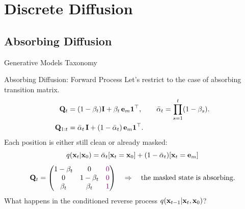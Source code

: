 \documentclass{beamer}
\begin{document}
\section{Discrete Diffusion}
\subsection{Absorbing Diffusion}
\begin{frame}{Generative Models Taxonomy}
\end{frame}
\begin{frame}{Absorbing Diffusion: Forward Process}
	Let's restrict to the case of absorbing transition matrix.
	\vspace{-0.3cm}
	\begin{align*}
		\mathbf{Q}_t &= (1-\beta_t)\mathbf{I} + \beta_t\, \mathbf{e}_m \mathbf{1}^\top,
		\qquad
		\bar\alpha_t = \prod_{s=1}^t (1-\beta_s). \\
		\mathbf{Q}_{1:t} &= \bar\alpha_t\,\mathbf{I} + (1-\bar\alpha_t)\,\mathbf{e}_m \mathbf{1}^\top.
	\end{align*}
	\eqpause
	Each position is either still clean or already masked:
	\[
		q(\mathbf{x}_t | \mathbf{x}_0) = \bar\alpha_t [\mathbf{x}_t = \mathbf{x}_0] + (1 - \bar\alpha_t) [\mathbf{x}_t = \mathbf{e}_m]
	\]
	\eqpause
	\[
		\mathbf{Q}_t =
		\begin{pmatrix}
			1-\beta_t & 0           & \color{violet}{0} \\
			0           & 1-\beta_t & \color{violet}{0} \\
			\beta_t     & \beta_t     & \color{violet}{1}
		\end{pmatrix} 
		\quad \Rightarrow \quad 
		\text{the masked state is absorbing.}
	\]
	\eqpause
	What happens in the conditioned reverse process
	$q(\mathbf{x}_{t-1} | \mathbf{x}_t, \mathbf{x}_0)$?
\end{frame}
\end{document}
